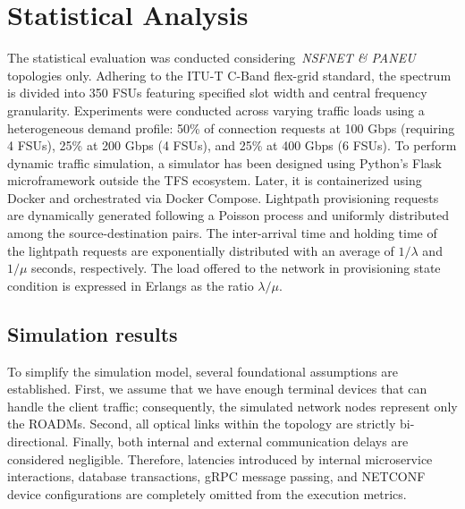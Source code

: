 \documentclass[12pt, a4paper, twoside, openright]{report}
\begin{document}
\section{Statistical Analysis}
The statistical evaluation was conducted considering~\emph{NSFNET \& PANEU} topologies only. Adhering to the ITU-T C-Band flex-grid standard, the spectrum is divided into 350 FSUs featuring specified slot width and central frequency granularity. Experiments were conducted across varying traffic loads using a heterogeneous demand profile: 50\% of connection requests at 100 Gbps (requiring 4 FSUs), 25\% at 200 Gbps (4 FSUs), and 25\% at 400 Gbps (6 FSUs). To perform dynamic traffic simulation, a simulator has been designed using Python's Flask microframework outside the TFS ecosystem. Later, it is containerized using Docker and orchestrated via Docker Compose. Lightpath provisioning requests are dynamically generated following a Poisson process and uniformly distributed among the source-destination pairs. The inter-arrival time and holding time of the lightpath requests are exponentially distributed with an average of $1/\lambda$ and $1/\mu$ seconds, respectively. The load offered to the network in provisioning state condition is expressed in Erlangs as the ratio $\lambda/\mu$.

\subsection{Simulation results}
To simplify the simulation model, several foundational assumptions are established. First, we assume that we have enough terminal devices that can handle the client traffic; consequently, the simulated network nodes represent only the ROADMs. Second, all optical links within the topology are strictly bi-directional. Finally, both internal and external communication delays are considered negligible. Therefore, latencies introduced by internal microservice interactions, database transactions, gRPC message passing, and NETCONF device configurations are completely omitted from the execution metrics.
\end{document}
